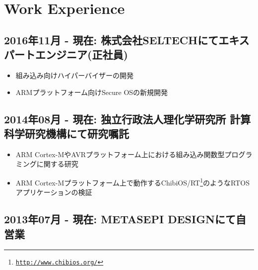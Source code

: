 \documentclass[letterpaper]{article}
\begin{document}
\section*{Work Experience}
\subsection*{2016年11月 - 現在: 株式会社SELTECHにてエキスパートエンジニア(正社員)}

\begin{itemize}
  \item 組み込み向けハイパーバイザーの開発
  \item ARMプラットフォーム向けSecure OSの新規開発
\end{itemize}

\subsection*{2014年08月 - 現在: 独立行政法人理化学研究所 計算科学研究機構にて研究嘱託}

\begin{itemize}
  \item ARM Cortex-MやAVRプラットフォーム上における組み込み関数型プログラミングに関する研究
  \item ARM Cortex-Mプラットフォーム上で動作するChibiOS/RT\footnote{\href{http://www.chibios.org/}{\tt http://www.chibios.org/}}のようなRTOSアプリケーションの検証
\end{itemize}

\subsection*{2013年07月 - 現在: METASEPI DESIGNにて自営業}
\end{document}
